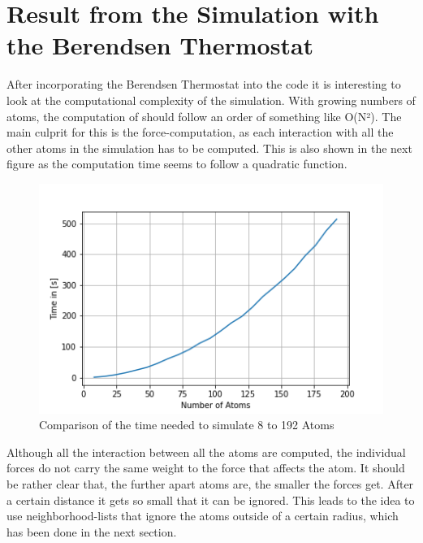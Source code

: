 \section{Result from the Simulation with the Berendsen Thermostat}

After incorporating the Berendsen Thermostat into the code it is interesting to look at the computational complexity of the simulation. With growing numbers of atoms, the computation of should follow an order of something like O(N²). The main culprit for this is the force-computation, as each interaction with all the other atoms in the simulation has to be computed. This is also shown in the next figure as the computation time seems to follow a quadratic function. 
\begin{figure}
	\begin{center}
		\includegraphics[scale=1]{Figure/plotAtomTimes.png}
	\end{center}
	\caption[Comparison of the time needed to simulate 8 to 192 Atoms]{Comparison of the time needed to simulate 8 to 192 Atoms}
	\label{PlotSimulationTimeBerendsenThermostat}
\end{figure}
Although all the interaction between all the atoms are computed, the individual forces do not carry the same weight to the force that affects the atom. It should be rather clear that, the further apart atoms are, the smaller the forces get. After a certain distance it gets so small that it can be ignored. This leads to the idea to use neighborhood-lists that ignore the atoms outside of a certain radius, which has been done in the next section.

